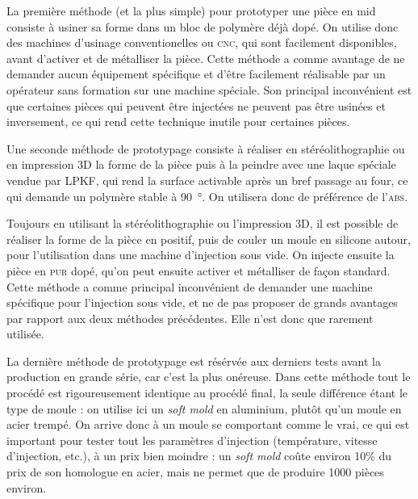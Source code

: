 La première méthode (et la plus simple) pour prototyper une pièce en \gls{mid} consiste à usiner sa forme dans un bloc de polymère déjà dopé.
On utilise donc des machines d'usinage conventionelles ou \textsc{cnc}, qui sont facilement disponibles, avant d'activer et de métalliser la pièce.
Cette méthode a comme avantage de ne demander aucun équipement spécifique et d'être facilement réalisable par un opérateur sans formation sur une machine spéciale.
Son principal inconvénient est que certaines pièces qui peuvent être injectées ne peuvent pas être usinées et inversement, ce qui rend cette technique inutile pour certaines pièces.

Une seconde méthode de prototypage consiste à réaliser en stéréolithographie ou en impression 3D la forme de la pièce puis à la peindre avec une laque spéciale vendue par LPKF, qui rend la surface activable après un bref passage au four, ce qui demande un polymère stable à \SI{90}{\degree}.
On utilisera donc de préférence de l'\textsc{abs}.

Toujours en utilisant la stéréolithographie ou l'impression 3D, il est possible de réaliser la forme de la pièce en positif, puis de couler un moule en silicone autour, pour l'utilisation dans une machine d'injection sous vide.
On injecte ensuite la pièce en \textsc{pur} dopé, qu'on peut ensuite activer et métalliser de façon standard.
Cette méthode a comme principal inconvénient de demander une machine spécifique pour l'injection sous vide, et ne de pas proposer de grands avantages par rapport aux deux méthodes précédentes.
Elle n'est donc que rarement utilisée.

La dernière méthode de prototypage est résérvée aux derniers tests avant la production en grande série, car c'est la plus onéreuse.
Dans cette méthode tout le procédé est rigoureusement identique au procédé final, la seule différence étant le type de moule : on utilise ici un \textit{soft mold} en aluminium, plutôt qu'un moule en acier trempé.
On arrive donc à un moule se comportant comme le vrai, ce qui est important pour tester tout les paramètres d'injection (température, vitesse d'injection, etc.), à un prix bien moindre : un \textit{soft mold} coûte environ 10\% du prix de son homologue en acier, mais ne permet que de produire 1000 pièces environ.
